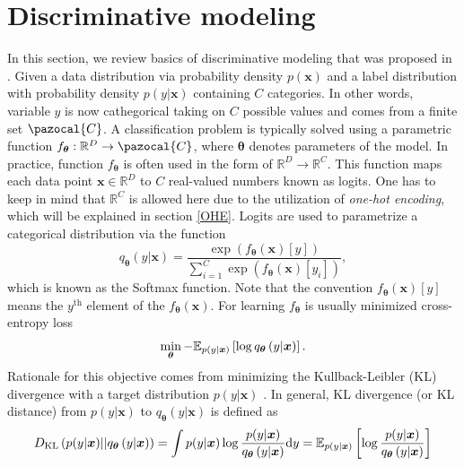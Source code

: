 \section{Discriminative modeling}
In this section, we review basics of discriminative modeling that was proposed in \cite{HDGEmain}. Given a data distribution via probability density $p(\boldsymbol{x})$ and a label distribution with probability density $p(y|\boldsymbol{x})$ containing $C$ categories. In other words, variable $y$ is now cathegorical taking on $C$ possible values and comes from a finite set $\pazocal{C}$.  A classification problem is typically solved using a parametric function $f_{\boldsymbol{\theta}} : \mathbb{R}^D \to \pazocal{C}$, where $\boldsymbol{\theta}$ denotes parameters of the model. In practice, function $f_{\boldsymbol{\theta}}$ is often used in the form of $\mathbb{R}^D \to  \mathbb{R}^C$. This function maps each data point $\boldsymbol{x} \in \mathbb{R}^D$ to $C$ real-valued numbers known as logits. One has to keep in mind that $\mathbb{R}^C$ is allowed here due to the utilization of \emph{one-hot encoding}, which will be explained in section \ref{OHE}. Logits are used to parametrize a categorical distribution via the function
\begin{equation}\label{softmax}
	q_{\boldsymbol{\theta}}\left(y|\boldsymbol{x}\right) = \frac{\exp\left({f_{\boldsymbol{\theta}}\left(\boldsymbol{x}\right)[y]}\right)}{\sum_{i=1}^C\exp\left({f_{\boldsymbol{\theta}}\left(\boldsymbol{x}\right)[y_i]}\right)},
\end{equation}
which is known as the Softmax function. Note that the convention $f_{\boldsymbol{\theta}}\left(\boldsymbol{x}\right)[y]$ means the $y^{\mathrm{th}}$ element of the $f_{\boldsymbol{\theta}}\left(\boldsymbol{x}\right)$. For learning $f_{\boldsymbol{\theta}}$ is usually minimized cross-entropy loss 
\begin{equation}\label{crossentropy}
	\min_{\boldsymbol{\theta}}- \mathbb{E}_{p(y|\boldsymbol{x})}\left[\log q_{\boldsymbol{\theta}}\left(y|\boldsymbol{x}\right)\right].
\end{equation} 
Rationale for this objective comes from minimizing the Kullback-Leibler (KL) divergence with a target distribution $p(y| \boldsymbol{x})$ \cite{KL}. In general,
KL divergence (or KL distance) from $p(y| \boldsymbol{x})$ to $q_{\boldsymbol{\theta}}\left(y|\boldsymbol{x}\right)$ is defined as
\begin{equation}\label{eq:KLdiv}
D_{\mathrm{KL}} \left(p(y| \boldsymbol{x}) || q_{\boldsymbol{\theta}}\left(y|\boldsymbol{x}\right) \right) = \int p(y| \boldsymbol{x})\log\frac{p(y| \boldsymbol{x})}{q_{\boldsymbol{\theta}}\left(y|\boldsymbol{x}\right)}\mathrm{d}{y} = \mathbb{E}_{p(y| \boldsymbol{x})} \left[\log\frac{p(y| \boldsymbol{x})}{q_{\boldsymbol{\theta}}\left(y|\boldsymbol{x}\right)} \right]
\end{equation}

